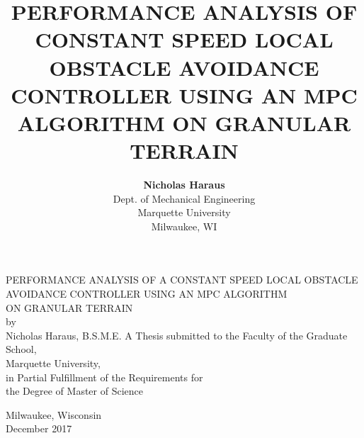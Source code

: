 \documentclass[12pt,onecolumn]{report}
\title{\myfont PERFORMANCE ANALYSIS OF CONSTANT SPEED LOCAL OBSTACLE AVOIDANCE CONTROLLER USING AN MPC ALGORITHM ON GRANULAR TERRAIN}
\author{
	{\bf Nicholas Haraus}\\
	Dept. of Mechanical Engineering\\
	Marquette University\\
	Milwaukee, WI
}
\renewcommand{\headrulewidth}{0pt}
\begin{document}
\fancyhf{} %
\renewcommand{\headrulewidth}{0pt}

\onecolumn
\begin{singlespacing}
\begin{center}
PERFORMANCE ANALYSIS OF A CONSTANT SPEED LOCAL OBSTACLE\\ AVOIDANCE CONTROLLER USING AN MPC ALGORITHM\\ ON GRANULAR TERRAIN
\\
\vfill
by\\
\vspace{0.1in}
Nicholas Haraus, B.S.M.E.
\vfill
A Thesis submitted to the Faculty of the Graduate School,\\
Marquette University,\\
in Partial Fulfillment of the Requirements for\\
the Degree of Master of Science

\vfill
Milwaukee, Wisconsin\\
\vspace{0.1in}
December 2017
\end{center}
\end{singlespacing}
\newpage
\end{document}
